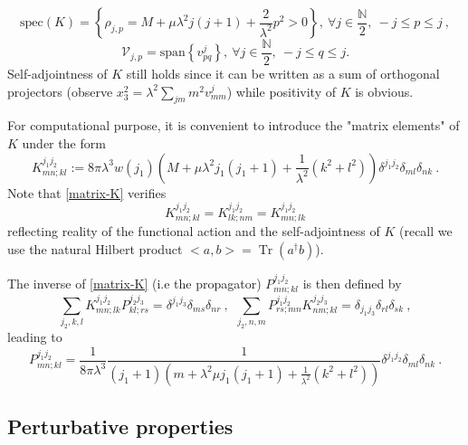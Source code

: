 \documentclass[a4paper,11pt,twoside]{article}
\numberwithin{equation}{section}
\DeclareMathOperator{\tr}{Tr}
\theoremstyle{nonumberplain}
\newcounter{and}
\begin{document}
%
\begin{equation}
\text{spec}(K) = \left\{ \rho_{j,p} = M + \mu \lambda^2 j(j+1) + \frac{2}{\lambda^2} p^2>0 \right\},\ \forall j \in \frac{\mathbb{N}}{2} , \ -j \le p \le j \ , \label{spec-K}
\end{equation}
%
\begin{equation}
\mathcal{V}_{j,p} = \text{span}\left\{v^j_{pq}\right\} , \ \forall j \in \frac{\mathbb{N}}{2} , \ -j \le q \le j . \label{eigensp-K}
\end{equation}
%
Self-adjointness of $K$ still holds since it can be written as a sum of orthogonal projectors (observe $x_3^2 = \lambda^2 \sum_{jm} m^2 v^j_{mm}$) while positivity of $K$ is obvious.\par%
%
For computational purpose, it is convenient to introduce the "matrix elements" of $K$ under the form%
%
\begin{equation}
K^{j_1 j_2}_{mn;kl} := 8\pi\lambda^3 w(j_1) \left( M + \mu \lambda^2 j_1 (j_1+1) + \frac{1}{\lambda^2} (k^2+l^2) \right) \delta^{j_1j_2} \delta_{ml} \delta_{nk} \ . \label{matrix-K} 
\end{equation}
%
Note that \eqref{matrix-K} verifies%
%
\begin{equation}
K^{j_1j_2}_{mn;kl} = K^{j_1j_2}_{lk;nm} = K^{j_1j_2}_{mn;lk} \label{sym-K}
\end{equation}
%
reflecting reality of the functional action and the self-adjointness of $K$ (recall we use the natural Hilbert product $<a,b>=\tr(a^\dag b)$).\par%
%
The inverse of \eqref{matrix-K} (i.e the propagator) $P^{j_1j_2}_{mn;kl}$ is then defined by%
%
\begin{equation}
\sum_{j_2,k,l} K^{j_1j_2}_{mn;lk} P^{j_2j_3}_{kl;rs} = \delta^{j_1j_3} \delta_{ms} \delta_{nr} \ , \ \ \sum_{j_2,n,m} P^{j_1j_2}_{rs;mn} K^{j_2j_3}_{nm;kl} = \delta_{j_1j_3} \delta_{rl} \delta_{sk} \ , \label{propagator-def}
\end{equation}
%
leading to%
%
\begin{equation}
P^{j_1j_2}_{mn;kl} = \frac{1}{8\pi\lambda^3} \frac{1}{(j_1+1)(m+\lambda^2\mu j_1(j_1+1)+\frac{1}{\lambda^2}(k^2+l^2))}\delta^{j_1j_2}\delta_{ml}\delta_{nk} \ .  \label{propagator}
\end{equation}

\subsection{Perturbative properties}\label{subsection32}
\end{document}
